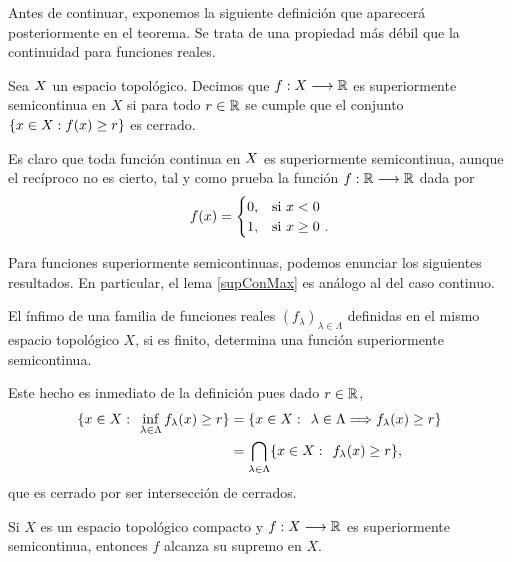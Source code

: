 Antes de continuar, exponemos la siguiente definición que aparecerá posteriormente en el teorema. Se trata de una propiedad más débil que la continuidad para funciones reales. 
\bigskip
\begin{definicion}
Sea $ X $ un espacio topológico. Decimos que $ f:X \longrightarrow \mathbb{R} $ es superiormente semicontinua en $ X $ si para todo $ r \in \mathbb{R} $ se cumple que el conjunto $ \lbrace x \in X : f(x) \geq r \rbrace $ es cerrado.
\end{definicion}
\bigskip
Es claro que toda función continua en $ X $ es superiormente semicontinua, aunque el recíproco no es cierto, tal y como prueba la función $ f:\mathbb{R} \longrightarrow \mathbb{R} $ dada por 
\[
f(x) = \begin{cases}
0, & \mbox{si $ x < 0 $ } \\
1, & \mbox{si $x \geq 0$ }.
\end{cases}
\]

Para funciones superiormente semicontinuas, podemos enunciar los siguientes resultados. En particular, el lema \ref{supConMax} es análogo al del caso continuo.
\bigskip
\begin{lemaBox}\label{infDeSupSemi}
El ínfimo de una familia de funciones reales $ (f_\lambda)_{\lambda \in \Lambda} $ definidas en el mismo espacio topológico $ X $, si es finito, determina una función superiormente semicontinua. 
\end{lemaBox}
\bigskip

Este hecho es inmediato de la definición pues dado $ r \in \mathbb{R} $, 
\begin{equation*}
\begin{split}
	\{ x \in X: \hspace{1.5mm} \inf_{ \lambda \in \Lambda}f_\lambda(x) \geq r\} &= \{ x \in X: \hspace{1.5mm} \lambda \in \Lambda \Longrightarrow f_\lambda(x) \geq r\}\\
	&=\bigcap_{\lambda \in \Lambda} \{ x \in X: \hspace{1.5mm}f_\lambda(x) \geq r \},
\end{split}
\end{equation*}
que es cerrado por ser intersección de cerrados. \\

\bigskip
\begin{lemaBox}\label{supConMax}
Si $ X $ es un espacio topológico compacto y $ f:X \longrightarrow \mathbb{R} $ es superiormente semicontinua, entonces $ f $ alcanza su supremo en $ X $.
\end{lemaBox}
\bigskip


